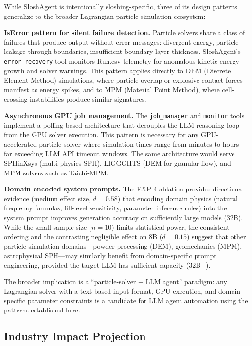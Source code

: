 \documentclass[11pt]{article}
\begin{document}
While SloshAgent is intentionally sloshing-specific, three of its design patterns generalize to the broader Lagrangian particle simulation ecosystem:

\textbf{IsError pattern for silent failure detection.} Particle solvers share a class of failures that produce output without error messages: divergent energy, particle leakage through boundaries, insufficient boundary layer thickness. SloshAgent's \texttt{error\_recovery} tool monitors Run.csv telemetry for anomalous kinetic energy growth and solver warnings. This pattern applies directly to DEM (Discrete Element Method) simulations, where particle overlap or explosive contact forces manifest as energy spikes, and to MPM (Material Point Method), where cell-crossing instabilities produce similar signatures.

\textbf{Asynchronous GPU job management.} The \texttt{job\_manager} and \texttt{monitor} tools implement a polling-based architecture that decouples the LLM reasoning loop from the GPU solver execution. This pattern is necessary for any GPU-accelerated particle solver where simulation times range from minutes to hours---far exceeding LLM API timeout windows. The same architecture would serve SPHinXsys (multi-physics SPH), LIGGGHTS (DEM for granular flow), and MPM solvers such as Taichi-MPM.

\textbf{Domain-encoded system prompts.} The EXP-4 ablation provides directional evidence (medium effect size, $d = 0.58$) that encoding domain physics (natural frequency formulas, fill-level sensitivity, parameter inference rules) into the system prompt improves generation accuracy on sufficiently large models (32B). While the small sample size ($n = 10$) limits statistical power, the consistent ordering and the contrasting negligible effect on 8B ($d = 0.15$) suggest that other particle simulation domains---powder processing (DEM), geomechanics (MPM), astrophysical SPH---may similarly benefit from domain-specific prompt engineering, provided the target LLM has sufficient capacity (32B+).

The broader implication is a ``particle-solver + LLM agent'' paradigm: any Lagrangian solver with a text-based input format, GPU execution, and domain-specific parameter constraints is a candidate for LLM agent automation using the patterns established here.

\subsection{Industry Impact Projection}
\end{document}
